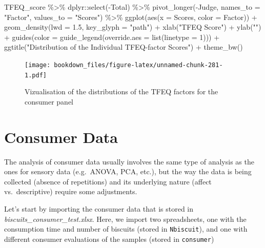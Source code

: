 \documentclass[
]{krantz}
\makeatletter
\newenvironment{Shaded}{\begin{snugshade}}{\end{snugshade}}
\newcommand{\AttributeTok}[1]{\textcolor[rgb]{0.61,0.61,0.61}{#1}}
\newcommand{\DecValTok}[1]{\textcolor[rgb]{0.06,0.06,0.06}{#1}}
\newcommand{\FloatTok}[1]{\textcolor[rgb]{0.06,0.06,0.06}{#1}}
\newcommand{\FunctionTok}[1]{\textcolor[rgb]{0,0,0}{#1}}
\newcommand{\NormalTok}[1]{#1}
\newcommand{\SpecialCharTok}[1]{\textcolor[rgb]{0,0,0}{#1}}
\newcommand{\StringTok}[1]{\textcolor[rgb]{0.5,0.5,0.5}{#1}}
\newenvironment{kframe}{%
\medskip{}
\setlength{\fboxsep}{.8em}
 \def\at@end@of@kframe{}%
 \ifinner\ifhmode%
  \def\at@end@of@kframe{\end{minipage}}%
  \begin{minipage}{\columnwidth}%
 \fi\fi%
 \def\FrameCommand##1{\hskip\@totalleftmargin \hskip-\fboxsep
 \colorbox{shadecolor}{##1}\hskip-\fboxsep
     \hskip-\linewidth \hskip-\@totalleftmargin \hskip\columnwidth}%
 \MakeFramed {\advance\hsize-\width
   \@totalleftmargin\z@ \linewidth\hsize
   \@setminipage}}%
 {\par\unskip\endMakeFramed%
 \at@end@of@kframe}
\renewenvironment{Shaded}{\begin{kframe}}{\end{kframe}}
\makeatother
\begin{document}
\begin{Shaded}
\begin{Highlighting}[]
\NormalTok{TFEQ\_score }\SpecialCharTok{\%\textgreater{}\%}
\NormalTok{  dplyr}\SpecialCharTok{::}\FunctionTok{select}\NormalTok{(}\SpecialCharTok{{-}}\NormalTok{Total) }\SpecialCharTok{\%\textgreater{}\%}
  \FunctionTok{pivot\_longer}\NormalTok{(}\SpecialCharTok{{-}}\NormalTok{Judge, }\AttributeTok{names\_to =} \StringTok{"Factor"}\NormalTok{, }\AttributeTok{values\_to =} \StringTok{"Scores"}\NormalTok{) }\SpecialCharTok{\%\textgreater{}\%}
  \FunctionTok{ggplot}\NormalTok{(}\FunctionTok{aes}\NormalTok{(}\AttributeTok{x =}\NormalTok{ Scores, }\AttributeTok{color =}\NormalTok{ Factor)) }\SpecialCharTok{+}
  \FunctionTok{geom\_density}\NormalTok{(}\AttributeTok{lwd =} \FloatTok{1.5}\NormalTok{, }\AttributeTok{key\_glyph =} \StringTok{"path"}\NormalTok{) }\SpecialCharTok{+}
  \FunctionTok{xlab}\NormalTok{(}\StringTok{"TFEQ Score"}\NormalTok{) }\SpecialCharTok{+}
  \FunctionTok{ylab}\NormalTok{(}\StringTok{""}\NormalTok{) }\SpecialCharTok{+}
  \FunctionTok{guides}\NormalTok{(}\AttributeTok{color =} \FunctionTok{guide\_legend}\NormalTok{(}\AttributeTok{override.aes =} \FunctionTok{list}\NormalTok{(}\AttributeTok{linetype =} \DecValTok{1}\NormalTok{))) }\SpecialCharTok{+}
  \FunctionTok{ggtitle}\NormalTok{(}\StringTok{"Distribution of the Individual TFEQ{-}factor Scores"}\NormalTok{) }\SpecialCharTok{+}
  \FunctionTok{theme\_bw}\NormalTok{()}
\end{Highlighting}
\end{Shaded}

\begin{figure}
\centering
\texttt{[image: bookdown\_files/figure-latex/unnamed-chunk-281-1.pdf]}
\caption{\label{fig:unnamed-chunk-281}Vizualisation of the distributions of the TFEQ factors for the consumer panel}
\end{figure}

\hypertarget{tibble-use}{%
\section{Consumer Data}\label{tibble-use}}

The analysis of consumer data usually involves the same type of analysis as the ones for sensory data (e.g.~ANOVA, PCA, etc.), but the way the data is being collected (absence of repetitions) and its underlying nature (affect vs.~descriptive) require some adjustments.

Let's start by importing the consumer data that is stored in \emph{biscuits\_consumer\_test.xlsx}. Here, we import two spreadsheets, one with the consumption time and number of biscuits (stored in \texttt{Nbiscuit}), and one with different consumer evaluations of the samples (stored in \texttt{consumer})
\end{document}
